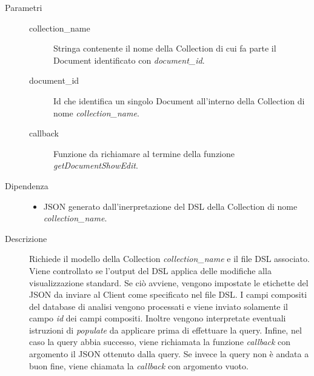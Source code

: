 \begin{description}
\begin{mldescription}
	 \hfill
		\begin{description}
			\item[Parametri] \hfill
				\begin{description}
					\item[collection\_name] \hfill
						Stringa contenente il nome della Collection di cui fa parte il Document identificato 							con \textit{document\_id}.
					\item[document\_id] \hfill
						Id che identifica un singolo Document all'interno della Collection di nome 									\textit{collection\_name}.
					\item[callback] \hfill
						Funzione da richiamare al termine della funzione \textit{getDocumentShowEdit}.
				\end{description}
			\item[Dipendenza] \hfill
				\begin{itemize}
					\item JSON generato dall'inerpretazione del DSL della Collection di nome 										\textit{collection\_name}.
				\end{itemize}
			\item[Descrizione] \hfill
			Richiede il modello della Collection \textit{collection\_name} e il file DSL associato. Viene controllato se l'output del DSL applica delle modifiche alla visualizzazione standard. Se ciò avviene, vengono impostate le etichette del JSON da inviare al Client come specificato nel file DSL. I campi compositi del database di analisi vengono processati e viene inviato solamente il campo \textit{id} dei campi compositi. Inoltre vengono interpretate eventuali istruzioni di \textit{populate} da applicare prima di effettuare la query. Infine, nel caso la query abbia successo, viene richiamata la funzione \textit{callback} con argomento il JSON ottenuto dalla query. Se invece la query non è andata a buon fine, viene chiamata la \textit{callback} con argomento vuoto.
		\end{description}
	

\end{mldescription}
\end{description}
